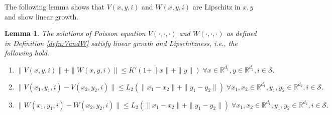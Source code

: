 \documentclass[letterpaper, 10 pt, conference]{ieeeconf}  %
\theoremstyle{definition}
\theoremstyle{plain}
\newtheorem{lemma}{Lemma}
\newcommand{\Scal}{\mathcal{S}}
\newcommand{\RR}{\mathbb{R}}
\begin{document}
The following lemma shows that $V(x,y,i)$ and $W(x,y,i)$ are Lipschitz in $x,y$ and show linear growth.
\begin{lemma}\label{lem:poisson_soln-prop}
    The solutions of Poisson equation $V(\cdot,\cdot,\cdot)$ and $W(\cdot,\cdot,\cdot)$ as defined in Definition \ref{defn:VandW} satisfy linear growth and Lipschitzness, i.e., the following hold.
    \begin{enumerate}[label=(\alph*)]
        \item $\|V(x,y,i)\|+\|W(x,y,i)\|\leq K'(1+\|x\|+\|y\|)\; \forall x\in\RR^{d_1}, y\in\RR^{d_2}, i\in\Scal.$
        \item $\|V(x_1,y_1,i)-V(x_2,y_2,i)\|\leq L_2(\|x_1-x_2\|+\|y_1-y_2\|) \; \forall x_1,x_2\in\RR^{d_1}, y_1,y_2\in\RR^{d_2}, i\in\Scal.$
        \item $\|W(x_1,y_1,i)-W(x_2,y_2,i)\|\leq L_2(\|x_1-x_2\|+\|y_1-y_2\|) \; \forall x_1,x_2\in\RR^{d_1}, y_1,y_2\in\RR^{d_2}, i\in\Scal.$
    \end{enumerate}
\end{lemma}
\end{document}
